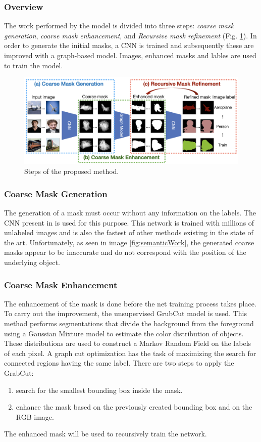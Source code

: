 \subsubsection{Overview}
The work performed by the model is divided into three steps: \emph{coarse mask 
generation}, \emph{coarse mask enhancement}, and \emph{Recursive mask refinement} (Fig. \ref{fig:step}). In 
order to generate the initial masks, a CNN is trained and subsequently these 
are improved with a graph-based model. Images, enhanced masks and lables 
are used to train the model.
\begin{figure}[h!]
    \centering
    \includegraphics[width = 1 \linewidth]{images/paper6/step.png}
    \centering
    \caption{Steps of the proposed method.}
    \label{fig:step}
\end{figure}

\subsubsection{Coarse Mask Generation}
The generation of a mask must occur without any information on the labels.
The CNN present in \cite{0876055520} is used for this purpose. This network is trained 
with millions of unlabeled images and is also the fastest of other methods 
existing in the state of the art. Unfortunately, as seen in image \ref{fig:semanticWork}, the 
generated coarse masks appear to be inaccurate and do not correspond with 
the position of the underlying object.

\subsubsection{Coarse Mask Enhancement}
The enhancement of the mask is done before the net training process takes 
place. To carry out the improvement, the unsupervised GrubCut model \cite{0876055542} 
is used. This method performs segmentations that divide the background 
from the foreground using a Gaussian Mixture model to estimate the color 
distribution of objects. These distributions are used to construct a Markov 
Random Field on the labels of each pixel. A graph cut optimization has the 
task of maximizing the search for connected regions having the same label. 
There are two steps to apply the GrabCut:
\begin{enumerate}
    \item search for the smallest bounding box inside the mask.
    \item enhance the mask based on the previously created bounding box and on the RGB image.
\end{enumerate}
The enhanced mask will be used to recursively train the network.

